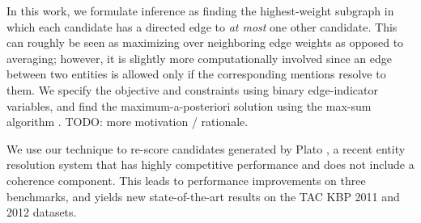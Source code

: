 In this work, we formulate inference as finding the highest-weight subgraph in which each candidate has a directed edge to \emph{at most} one other candidate. This can roughly be seen as maximizing over neighboring edge weights as opposed to averaging; however, it is slightly more computationally involved since an edge between two entities is allowed only if the corresponding mentions resolve to them. We specify the objective and constraints using binary edge-indicator variables, and find the maximum-a-posteriori solution using the max-sum algorithm \cite{Kschischang2001}. TODO: more motivation / rationale.
 
We use our technique to re-score candidates generated by Plato \cite{Lazic2015}, a recent entity resolution system that has highly competitive performance and does not include a coherence component. This leads to performance improvements on three benchmarks, and yields new state-of-the-art results on the TAC KBP 2011 and 2012 datasets.

